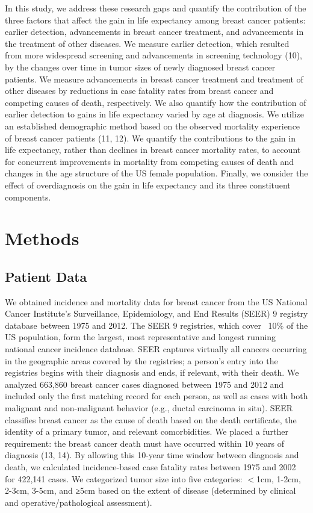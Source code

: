 \documentclass[11pt,letterpaper]{article}
\theoremstyle{plain}
\theoremstyle{remark}
\numberwithin{equation}{section}
\begin{document}
In this study, we address these research gaps and quantify the
contribution of the three factors that affect the gain in life
expectancy among breast cancer patients: earlier detection,
advancements in breast cancer treatment, and advancements in the
treatment of other diseases.  We measure earlier detection, which
resulted from more widespread screening and advancements in screening
technology (10), by the changes over time in tumor sizes of newly
diagnosed breast cancer patients.  We measure advancements in breast
cancer treatment and treatment of other diseases by reductions in case
fatality rates from breast cancer and competing causes of death,
respectively.  We also quantify how the contribution of earlier
detection to gains in life expectancy varied by age at diagnosis.  We
utilize an established demographic method based on the observed
mortality experience of breast cancer patients (11, 12).  We quantify
the contributions to the gain in life expectancy, rather than declines
in breast cancer mortality rates, to account for concurrent
improvements in mortality from competing causes of death and changes
in the age structure of the US female population.  Finally, we
consider the effect of overdiagnosis on the gain in life expectancy
and its three constituent components.

\section{Methods}
\subsection{Patient Data}
We obtained incidence and mortality data for breast cancer from the US
National Cancer Institute’s Surveillance, Epidemiology, and End
Results (SEER) 9 registry database between 1975 and 2012.  The SEER 9
registries, which cover ~10\% of the US population, form the largest,
most representative and longest running national cancer incidence
database.  SEER captures virtually all cancers occurring in the
geographic areas covered by the registries; a person’s entry into the
registries begins with their diagnosis and ends, if relevant, with
their death.  We analyzed 663,860 breast cancer cases diagnosed
between 1975 and 2012 and included only the first matching record for
each person, as well as cases with both malignant and non-malignant
behavior (e.g., ductal carcinoma in situ). SEER classifies breast
cancer as the cause of death based on the death certificate, the
identity of a primary tumor, and relevant comorbidities.  We placed a
further requirement: the breast cancer death must have occurred within
10 years of diagnosis (13, 14).  By allowing this 10-year time window
between diagnosis and death, we calculated incidence-based case
fatality rates between 1975 and 2002 for 422,141 cases.  We
categorized tumor size into five categories: $<$1cm, 1-2cm, 2-3cm,
3-5cm, and ≥5cm based on the extent of disease (determined by clinical
and operative/pathological assessment).
\end{document}
